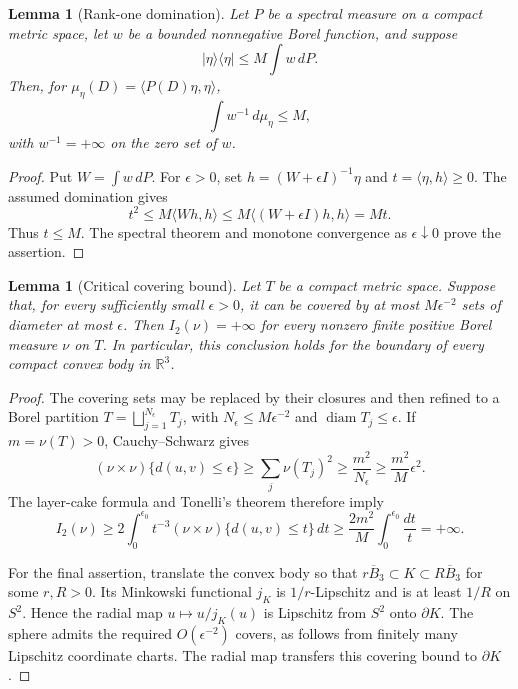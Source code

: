 \documentclass[11pt,letterpaper]{amsart}
\newtheorem{lemma}[theorem]{Lemma}
\theoremstyle{definition}
\theoremstyle{remark}
\numberwithin{equation}{section}
\begin{document}
\begin{lemma}[Rank-one domination]\label{lb:lem:rankone}
Let $P$ be a spectral measure on a compact metric space, let
$w$ be a bounded nonnegative Borel function, and suppose
\[
 |\eta\rangle\langle\eta|\le M\int w\,dP.
\]
Then, for $\mu_\eta(D)=\langle P(D)\eta,\eta\rangle$,
\[
                  \int w^{-1}\,d\mu_\eta\le M,
\]
with $w^{-1}=+\infty$ on the zero set of $w$.
\end{lemma}
\begin{proof}
Put $W=\int w\,dP$. For $\epsilon>0$, set
$h=(W+\epsilon I)^{-1}\eta$ and
$t=\langle\eta,h\rangle\ge0$. The assumed domination gives
\[
 t^2\le M\langle Wh,h\rangle
       \le M\langle(W+\epsilon I)h,h\rangle=Mt.
\]
Thus $t\le M$. The spectral theorem and monotone convergence
as $\epsilon\downarrow0$ prove the assertion.
\end{proof}

\begin{lemma}[Critical covering bound]\label{lb:lem:energy}
Let $T$ be a compact metric space. Suppose that, for every
sufficiently small $\epsilon>0$, it can be covered by at most
$M\epsilon^{-2}$ sets of diameter at most $\epsilon$.
Then $I_2(\nu)=+\infty$ for every nonzero finite positive
Borel measure $\nu$ on $T$.
In particular, this conclusion holds for the boundary of
every compact convex body in $\mathbb R^3$.
\end{lemma}
\begin{proof}
The covering sets may be replaced by their closures and then
refined to a Borel partition
$T=\bigsqcup_{j=1}^{N_\epsilon}T_j$, with
$N_\epsilon\le M\epsilon^{-2}$ and
$\operatorname{diam}T_j\le\epsilon$.
If $m=\nu(T)>0$, Cauchy--Schwarz gives
\[
 (\nu\times\nu)\{d(u,v)\le\epsilon\}
 \ge\sum_j\nu(T_j)^2
 \ge\frac{m^2}{N_\epsilon}
 \ge\frac{m^2}{M}\epsilon^2.
\]
The layer-cake formula and Tonelli's theorem therefore imply
\[
 I_2(\nu)
 \ge2\int_0^{\epsilon_0}t^{-3}
       (\nu\times\nu)\{d(u,v)\le t\}\,dt
 \ge\frac{2m^2}{M}\int_0^{\epsilon_0}\frac{dt}{t}
 =+\infty.
\]

For the final assertion, translate the convex body so that
$r\overline B_3\subset K\subset R\overline B_3$ for some
$r,R>0$. Its Minkowski functional $j_K$ is $1/r$-Lipschitz and
is at least $1/R$ on $S^2$. Hence the radial map
$u\mapsto u/j_K(u)$ is Lipschitz from $S^2$ onto $\partial K$.
The sphere admits the required $O(\epsilon^{-2})$ covers,
as follows from finitely many Lipschitz coordinate charts.
The radial map transfers this covering bound to $\partial K$.
\end{proof}
\end{document}
